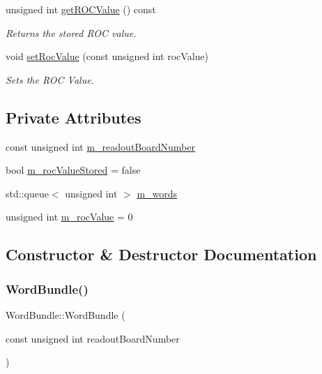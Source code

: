 \begin{DoxyCompactItemize}
unsigned int \hyperlink{class_word_bundle_ad2c91f230ac93d19900eba6b2c64d0e9}{get\+R\+O\+C\+Value} () const
\begin{DoxyCompactList}\small\item\em Returns the stored R\+OC value. \end{DoxyCompactList}\item 
void \hyperlink{class_word_bundle_a15e13fdd7380c72be2f42013560d62c3}{set\+Roc\+Value} (const unsigned int roc\+Value)
\begin{DoxyCompactList}\small\item\em Sets the R\+OC Value. \end{DoxyCompactList}\end{DoxyCompactItemize}
\subsection*{Private Attributes}
\begin{DoxyCompactItemize}
\item 
const unsigned int \hyperlink{class_word_bundle_a8c6594819625e90aebfd248a8c11916b}{m\+\_\+readout\+Board\+Number}
\item 
bool \hyperlink{class_word_bundle_a7605157c872054d7ab42b590fac97ca7}{m\+\_\+roc\+Value\+Stored} = false
\item 
std\+::queue$<$ unsigned int $>$ \hyperlink{class_word_bundle_a58233a5455b9a594e3441dd79e3d6a3b}{m\+\_\+words}
\item 
unsigned int \hyperlink{class_word_bundle_a2510a567b83584e8b53395168d53c401}{m\+\_\+roc\+Value} = 0
\end{DoxyCompactItemize}


\subsection{Constructor \& Destructor Documentation}
\mbox{\label{class_word_bundle_aef51ca0125b0b39fff34bfa47ddc4334}} 
\subsubsection{\texorpdfstring{Word\+Bundle()}{WordBundle()}}
{\footnotesize\ttfamily Word\+Bundle\+::\+Word\+Bundle (\begin{DoxyParamCaption}\item[{const unsigned int}]{readout\+Board\+Number }\end{DoxyParamCaption})}




